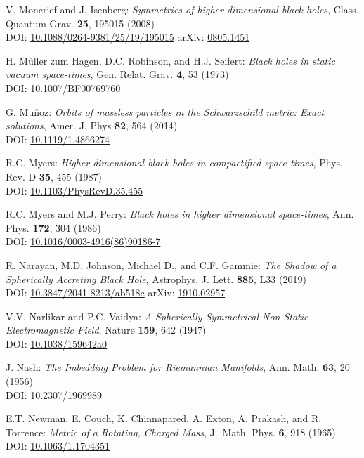 \begin{thebibliography}{123}
V. Moncrief and J. Isenberg:
{\em Symmetries of higher dimensional black holes},
Class. Quantum Grav. {\bf 25}, 195015 (2008)\\
DOI: \href{https://doi.org/10.1088/0264-9381/25/19/195015}{10.1088/0264-9381/25/19/195015}\hfill
arXiv: \href{https://arxiv.org/abs/0805.1451}{0805.1451}

H. Müller zum Hagen, D.C. Robinson, and H.J. Seifert:
{\em Black holes in static vacuum space-times},
Gen. Relat. Grav. {\bf 4}, 53 (1973)\\
DOI: \href{https://doi.org/10.1007/BF00769760}{10.1007/BF00769760}

G. Mu\~noz:
{\em Orbits of massless particles in the Schwarzschild metric: Exact solutions},
Amer. J. Phys {\bf 82}, 564 (2014)\\
DOI: \href{https://doi.org/10.1119/1.4866274}{10.1119/1.4866274}

R.C. Myers:
{\em Higher-dimensional black holes in compactified space-times},
Phys. Rev. D {\bf 35}, 455 (1987)\\
DOI: \href{https://doi.org/10.1103/PhysRevD.35.455}{10.1103/PhysRevD.35.455}

R.C. Myers and M.J. Perry:
{\em Black holes in higher dimensional space-times},
Ann. Phys. {\bf 172}, 304 (1986)\\
DOI: \href{https://doi.org/10.1016/0003-4916(86)90186-7}{10.1016/0003-4916(86)90186-7}

R. Narayan, M.D. Johnson, Michael D., and C.F. Gammie:
{\em The Shadow of a Spherically Accreting Black Hole},
Astrophys. J. Lett. {\bf 885}, L33 (2019)\\
DOI: \href{https://doi.org/10.3847/2041-8213/ab518c}{10.3847/2041-8213/ab518c}\hfill
arXiv: \href{https://arxiv.org/abs/1910.02957}{1910.02957}

V.V. Narlikar and P.C. Vaidya:
{\em A Spherically Symmetrical Non-Static Electromagnetic Field},
Nature {\bf 159}, 642 (1947) \\
DOI: \href{https://doi.org/10.1038/159642a0}{10.1038/159642a0}

J. Nash:
{\em The Imbedding Problem for Riemannian Manifolds},
Ann. Math. {\bf 63}, 20 (1956)\\
DOI: \href{https://doi.org/10.2307/1969989}{10.2307/1969989}

E.T. Newman, E. Couch, K. Chinnapared, A. Exton, A. Prakash, and R. Torrence:
{\em Metric of a Rotating, Charged Mass},
J.~Math. Phys. {\bf 6}, 918 (1965)\\
DOI: \href{https://doi.org/10.1063/1.1704351}{10.1063/1.1704351}


\end{thebibliography}
